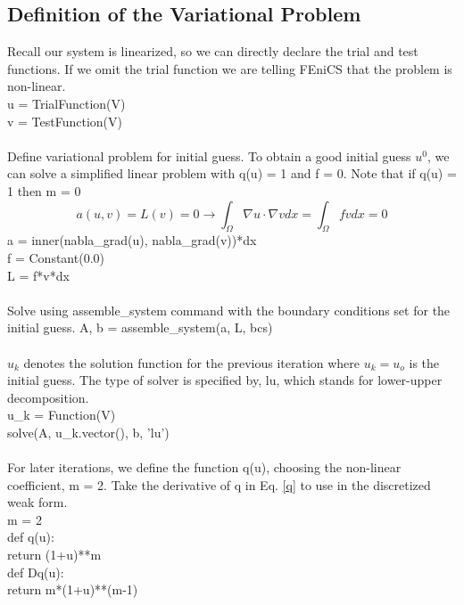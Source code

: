 \documentclass[12pt,3p]{article}
\begin{document}
\subsection{Definition of the Variational Problem}
Recall our system is linearized, so we can directly declare the trial and test functions. If we omit the trial function we are telling FEniCS that the problem is non-linear. \\
{\selectfont
u = TrialFunction(V) \\
v = TestFunction(V) \\ \\
}
Define variational problem for initial guess. To obtain a good initial guess $u^0$, we can solve a simplified linear problem with q(u) = 1 and f = 0. Note that if q(u) = 1 then m = 0
\begin{equation*}
a(u, v) = L(v) = 0 \rightarrow \int_{\Omega} \nabla u \cdot \nabla v dx = \int_{\Omega} fv dx = 0
\end{equation*}
{\selectfont
a = inner(nabla\_grad(u), nabla\_grad(v))*dx \\
f = Constant(0.0) \\ 
L = f*v*dx \\ \\
}
Solve using {\selectfont assemble\_system} command with the boundary conditions set for the initial guess. 
{\selectfont
A, b = assemble\_system(a, L, bcs) \\ \\
}
$u_k$ denotes the solution function for the previous iteration where $u_k = u_o$ is the initial guess. The type of solver is specified by, {\selectfont lu}, which stands for lower-upper decomposition. \\
{\selectfont
u\_k = Function(V) \\
solve(A, u\_k.vector(), b, 'lu') \\ \\
}
For later iterations, we define the function q(u), choosing the non-linear coefficient, m = 2. Take the derivative of q in Eq. \ref{q} to use in the discretized weak form.  \\
{\selectfont
m = 2 \\
def q(u): \\
\indent return (1+u)**m \\
def Dq(u): \\
\indent return m*(1+u)**(m-1) 
}
\end{document}
